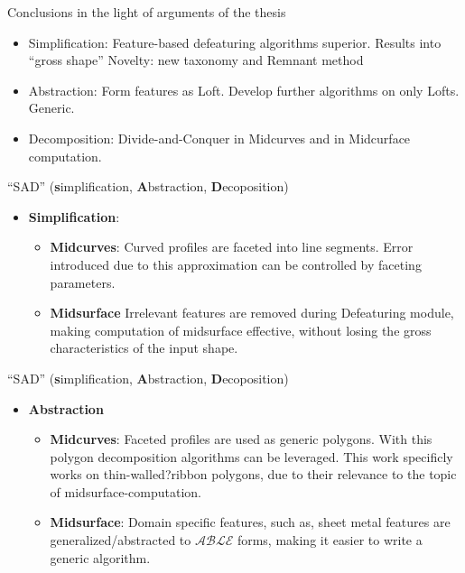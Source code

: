 \begin{frame}{Conclusions in the light of arguments of the thesis}
\begin{itemize}[noitemsep,label=\textbullet,topsep=2pt,parsep=2pt,partopsep=2pt]
\item Simplification: Feature-based defeaturing algorithms superior.  Results into ``gross shape'' Novelty: new taxonomy and Remnant method
\item Abstraction: Form features as Loft. Develop further algorithms on only Lofts. Generic.
\item Decomposition: Divide-and-Conquer in Midcurves and in Midcurface computation. 
\end{itemize}
\end{frame}

\begin{frame}{``SAD'' (\textbf{s}implification, \textbf{A}bstraction, \textbf{D}ecoposition)}
\begin{itemize}
\item \textbf{Simplification}: 
	\begin{itemize}
	\item \textbf{Midcurves}: Curved profiles are faceted into line segments. Error introduced due to this approximation can be controlled by faceting parameters.
	\item \textbf{Midsurface} Irrelevant features are removed during Defeaturing module, making computation of midsurface effective, without losing the gross characteristics of the input shape.
	\end{itemize}
\end{itemize}
\end{frame}

\begin{frame}{``SAD'' (\textbf{s}implification, \textbf{A}bstraction, \textbf{D}ecoposition)}
\begin{itemize}

\item \textbf{Abstraction} 
	\begin{itemize}
	\item \textbf{Midcurves}: Faceted profiles are used as generic polygons. With this polygon decomposition algorithms can be leveraged. This work specificly works on thin-walled?ribbon polygons, due to their relevance to the topic of midsurface-computation.
	\item \textbf{Midsurface}: Domain specific features, such as, sheet metal features are generalized/abstracted to $\mathcal{ABLE}$ forms, making it easier to write a generic algorithm.
	\end{itemize}
\end{itemize}
\end{frame}

